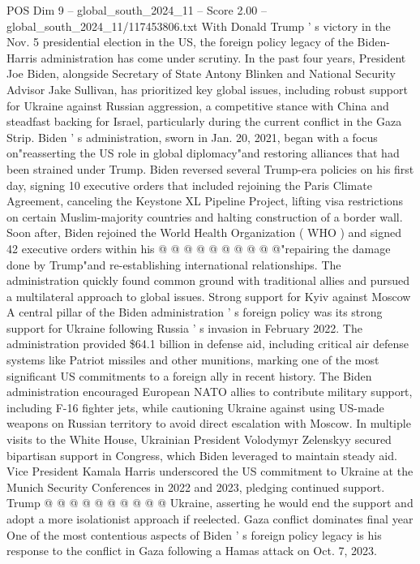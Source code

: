 \begin{textsample}{POS Dim 9 – global\_south\_2024\_11 – Score 2.00 – global\_south\_2024\_11/117453806.txt}  \label{ex:f9_pos_026}
With Donald Trump ' s victory in the Nov. 5 presidential election in the US, the foreign policy legacy of the Biden-Harris administration has come under scrutiny.
In the past four years, President Joe Biden, alongside Secretary of State Antony Blinken and National Security Advisor Jake Sullivan, has prioritized key global issues, including robust support for Ukraine against Russian aggression, a competitive stance with China and steadfast backing for Israel, particularly during the current conflict in the Gaza Strip.
Biden ' s administration, sworn in Jan. 20, 2021, began with a focus on"reasserting the US role in global diplomacy"and restoring alliances that had been strained under Trump.
Biden reversed several Trump-era policies on his first day, signing 10 executive orders that included rejoining the Paris Climate Agreement, canceling the Keystone XL Pipeline Project, lifting visa restrictions on certain Muslim-majority countries and halting construction of a border wall.
Soon after, Biden rejoined the World Health Organization ( WHO ) and signed 42 executive orders within his @ @ @ @ @ @ @ @ @ @"repairing the damage done by Trump"and re-establishing international relationships.
The administration quickly found common ground with traditional allies and pursued a multilateral approach to global issues.
Strong support for Kyiv against Moscow A central pillar of the Biden administration ' s foreign policy was its strong support for Ukraine following Russia ' s invasion in February 2022.
The administration provided \$64.1 billion in defense aid, including critical air defense systems like Patriot missiles and other munitions, marking one of the most significant US commitments to a foreign ally in recent history.
The Biden administration encouraged European NATO allies to contribute military support, including F-16 fighter jets, while cautioning Ukraine against using US-made weapons on Russian territory to avoid direct escalation with Moscow.
In multiple visits to the White House, Ukrainian President Volodymyr Zelenskyy secured bipartisan support in Congress, which Biden leveraged to maintain steady aid.
Vice President Kamala Harris underscored the US commitment to Ukraine at the Munich Security Conferences in 2022 and 2023, pledging continued support.
Trump @ @ @ @ @ @ @ @ @ @ Ukraine, asserting he would end the support and adopt a more isolationist approach if reelected.
Gaza conflict dominates final year One of the most contentious aspects of Biden ' s foreign policy legacy is his response to the conflict in Gaza following a Hamas attack on Oct. 7, 2023.

\end{textsample}
